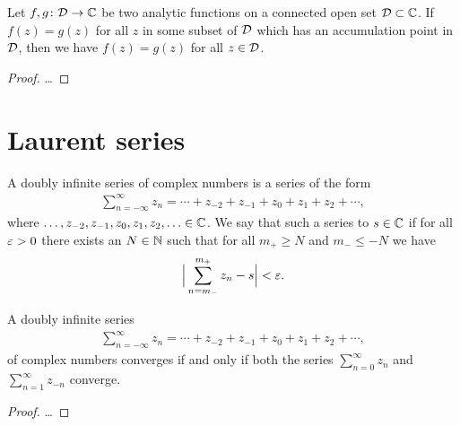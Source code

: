 \begin{corollary}
  \label{cor:ANALYTIC_CONTINUATION}
  Let $f, g \colon \mathcal{D} \to \mathbb{C}$ be two analytic functions on a connected
  open set $\mathcal{D} \subset \mathbb{C}$.
  If $f(z) = g(z)$ for all $z$ in
  some subset of $\mathcal{D}$ which has an accumulation point in $\mathcal{D}$,
  then we have $f(z) = g(z)$ for all $z \in \mathcal{D}$.
\end{corollary}
\begin{proof}
  \ldots
\end{proof}



\section{Laurent series}

\begin{definition}
  \label{def:doubly_infinite_series}
  A doubly infinite series of complex numbers is a series of the form
  \begin{align*}
    \sum_{n=-\infty}^\infty z_n
      = \cdots + z_{-2} + z_{-1} + z_0 + z_1 + z_2 + \cdots ,
  \end{align*}
  where $\ldots, z_{-2}, z_{-1}, z_0, z_1, z_2, \ldots \in \mathbb{C}$.
  We say that such a series  to $s \in \mathbb{C}$ if
  for all $\varepsilon > 0$ there exists an $N \in \mathbb{N}$
  such that for all $m_+ \ge N$ and $m_- \le -N$ we have
  \begin{align*}
    \Big| \sum_{n=m_-}^{m_+} z_n - s \Big| < \varepsilon .
  \end{align*}
\end{definition}

\begin{lemma}
  \label{lem:convergence_doubly_infinite}
  A doubly infinite series
  \begin{align*}
    \sum_{n=-\infty}^\infty z_n
      = \cdots + z_{-2} + z_{-1} + z_0 + z_1 + z_2 + \cdots ,
  \end{align*}
  of complex numbers converges if and only if both the series
  $\sum_{n=0}^\infty z_n$ and $\sum_{n=1}^\infty z_{-n}$ converge.
\end{lemma}
\begin{proof}
  \ldots
\end{proof}

